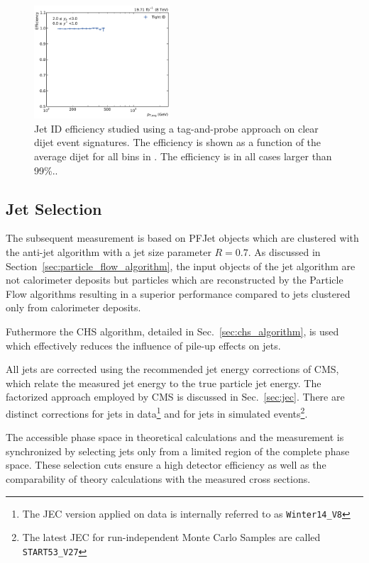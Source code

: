 \begin{figure}[htbp]
    \includegraphics[width=0.45\textwidth]{figures/measurement/jetideff_yb2ys0.pdf}
    \caption[Efficiency of the jet ID]{Jet ID efficiency studied using a
    tag-and-probe approach on clear dijet event signatures. The efficiency is
    shown as a function of the average dijet \pt for all bins in \ystar \yboost. The
    efficiency is in all cases larger than 99\%..}
    \label{fig:jetid_eff}
\end{figure}

\subsection{Jet Selection}

The subsequent measurement is based on PFJet objects which are clustered
with the anti-\kt jet algorithm with a jet size parameter $R=0.7$. As discussed in
Section~\ref{sec:particle_flow_algorithm}, the input objects of the jet algorithm are not
calorimeter deposits but particles which are reconstructed by the Particle Flow
algorithms resulting in a superior performance compared to jets clustered only from
calorimeter deposits. 

Futhermore the CHS algorithm, detailed in Sec.~\ref{sec:chs_algorithm}, is used which effectively
reduces the influence of pile-up effects on jets.

All jets are corrected using the recommended jet energy corrections of CMS,
which relate the measured jet energy to the true particle jet energy. The
factorized approach employed by CMS is discussed in Sec.~\ref{sec:jec}. There are
distinct corrections for jets in data\footnote{The JEC version applied on data
    is internally referred to as \texttt{Winter14\_V8}} and for jets in simulated
events\footnote{The latest JEC for run-independent Monte Carlo Samples are
    called \texttt{START53\_V27}}.


The accessible phase space in theoretical calculations and the measurement is
synchronized by selecting jets only from a limited region of the complete phase
space. These selection cuts ensure a high detector efficiency as well as the
comparability of theory calculations with the measured cross sections.

